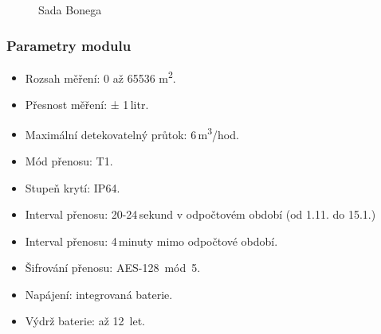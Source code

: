 	\begin{figure}[!ht]
	\vspace{-20pt}
    \centering
			\hspace*{5mm}
			\hspace*{5mm}
		\caption{Sada Bonega~\cite{CidloBonega}}
		\vspace{-10pt}
\end{figure}



\subsubsection{Parametry modulu}
\begin{itemize}
	\item Rozsah měření: 0 až 65536 m\textsuperscript{2}.
	\item Přesnost měření: ± 1\,litr.
	\item Maximální detekovatelný průtok: 6\,m\textsuperscript{3}/hod.
	\item Mód přenosu: T1.
	\item Stupeň krytí: IP64.
	\item Interval přenosu: 20-24\,sekund v odpočtovém období (od 1.11. do 15.1.)
	\item Interval přenosu: 4\,minuty mimo odpočtové období.
	\item Šifrování přenosu: AES-128~mód~5.
	\item Napájení: integrovaná baterie.
	\item Výdrž baterie: až 12~let.
\end{itemize}


